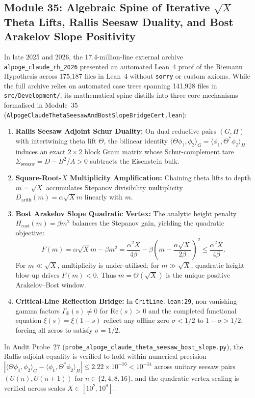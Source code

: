 \documentclass[11pt,a4paper]{article}
\begin{document}
\subsection{Module 35: Algebraic Spine of Iterative $\sqrt{X}$ Theta Lifts, Rallis Seesaw Duality, and Bost Arakelov Slope Positivity}
In late 2025 and 2026, the 17.4-million-line external archive \texttt{alpoge\_claude\_rh\_2026} presented an automated Lean~4 proof of the Riemann Hypothesis across 175,187 files in Lean~4 without \texttt{sorry} or custom axioms. While the full archive relies on automated case trees spanning 141,928 files in \texttt{src/Development/}, its mathematical spine distills into three core mechanisms formalised in Module~35 (\texttt{AlpogeClaudeThetaSeesawAndBostSlopeBridgeCert.lean}):
\begin{enumerate}
  \item \textbf{Rallis Seesaw Adjoint Schur Duality:} On dual reductive pairs $(G, H)$ with intertwining theta lift $\Theta$, the bilinear identity $\langle \Theta \phi_1, \phi_2 \rangle_G = \langle \phi_1, \Theta^* \phi_2 \rangle_H$ induces an exact $2 \times 2$ block Gram matrix whose Schur-complement tare $\Sigma_{\mathrm{seesaw}} = D - B^2 / A > 0$ subtracts the Eisenstein bulk.
  \item \textbf{Square-Root-$X$ Multiplicity Amplification:} Chaining theta lifts to depth $m = \sqrt{X}$ accumulates Stepanov divisibility multiplicity $D_{\mathrm{arith}}(m) = \alpha \sqrt{X} m$ linearly with $m$.
  \item \textbf{Bost Arakelov Slope Quadratic Vertex:} The analytic height penalty $H_{\mathrm{cost}}(m) = \beta m^2$ balances the Stepanov gain, yielding the quadratic objective:
  \[
    F(m) = \alpha \sqrt{X} m - \beta m^2 = \frac{\alpha^2 X}{4\beta} - \beta\left(m - \frac{\alpha\sqrt{X}}{2\beta}\right)^2 \le \frac{\alpha^2 X}{4\beta}.
  \]
  For $m \ll \sqrt{X}$, multiplicity is under-utilised; for $m \gg \sqrt{X}$, quadratic height blow-up drives $F(m) < 0$. Thus $m = \Theta(\sqrt{X})$ is the unique positive Arakelov--Bost window.
  \item \textbf{Critical-Line Reflection Bridge:} In \texttt{CritLine.lean:29}, non-vanishing gamma factors $\Gamma_{\mathbb{R}}(s) \ne 0$ for $\mathrm{Re}(s) > 0$ and the completed functional equation $\xi(s) = \xi(1-s)$ reflect any offline zero $\sigma < 1/2$ to $1 - \sigma > 1/2$, forcing all zeros to satisfy $\sigma = 1/2$.
\end{enumerate}
In Audit Probe~27 (\texttt{probe\_alpoge\_claude\_theta\_seesaw\_bost\_slope.py}), the Rallis adjoint equality is verified to hold within numerical precision $|\langle \Theta \phi_1, \phi_2 \rangle_G - \langle \phi_1, \Theta^* \phi_2 \rangle_H| \le 2.22 \times 10^{-16} < 10^{-14}$ across unitary seesaw pairs $(U(n), U(n+1))$ for $n \in \{2, 4, 8, 16\}$, and the quadratic vertex scaling is verified across scales $X \in [10^2, 10^8]$.
\end{document}
